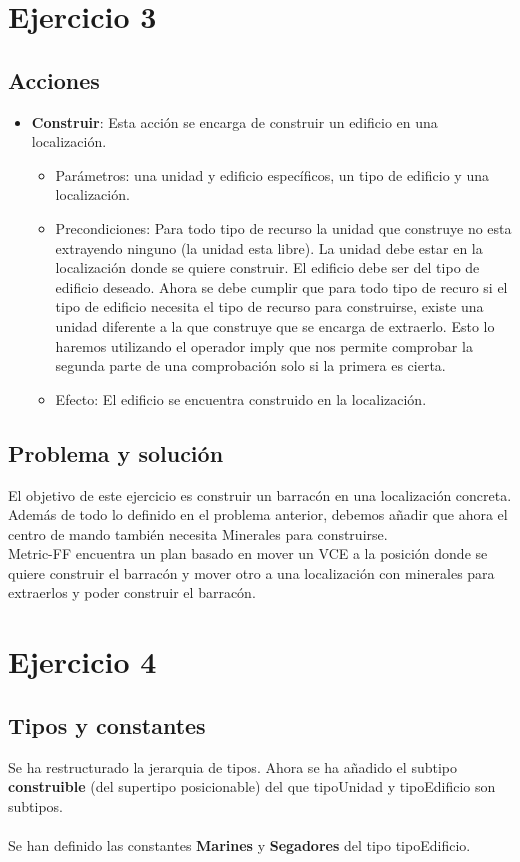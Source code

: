 \section{Ejercicio 3}
\subsection{Acciones}
\begin{itemize}
   \item \textbf{Construir}: Esta acción se encarga de construir un edificio en una localización.
   \begin{itemize}
      \item Parámetros: una unidad y edificio específicos, un tipo de edificio y una localización.
      \item Precondiciones: Para todo tipo de recurso la unidad que construye no esta extrayendo ninguno (la unidad esta libre). La unidad debe estar en la localización donde se quiere construir. El edificio debe ser del tipo de edificio deseado. Ahora se debe cumplir que para todo tipo de recuro si el tipo de edificio necesita el tipo de recurso para construirse, existe una unidad diferente a la que construye que se encarga de extraerlo. Esto lo haremos utilizando el operador imply que nos permite comprobar la segunda parte de una comprobación solo si la primera es cierta.
      \item Efecto: El edificio se encuentra construido en la localización.
   \end{itemize}
\end{itemize}
\subsection{Problema y solución}
El objetivo de este ejercicio es construir un barracón en una localización concreta.\\
Además de todo lo definido en el problema anterior, debemos añadir que ahora el centro de mando también necesita Minerales para construirse.\\
Metric-FF encuentra un plan basado en mover un VCE a la posición donde se quiere construir el barracón y mover otro a una localización con minerales para extraerlos y poder construir el barracón.


\section{Ejercicio 4}

\subsection{Tipos y constantes}
Se ha restructurado la jerarquia de tipos. Ahora se ha añadido el subtipo \textbf{construible} (del supertipo posicionable) del que tipoUnidad y tipoEdificio son subtipos.
\\\\
Se han definido las constantes \textbf{Marines} y \textbf{Segadores} del tipo tipoEdificio.
